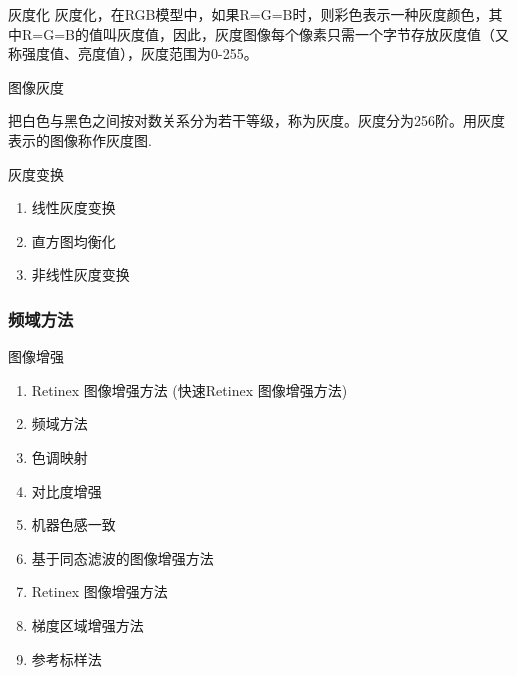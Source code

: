\documentclass{beamer}
\begin{document}
\begin{frame}
  \begin{block}{灰度化}
灰度化，在RGB模型中，如果R=G=B时，则彩色表示一种灰度颜色，其中R=G=B的值叫灰度值，因此，灰度图像每个像素只需一个字节存放灰度值（又称强度值、亮度值），灰度范围为0-255。
\end{block}
\begin{block}{图像灰度}

把白色与黑色之间按对数关系分为若干等级，称为灰度。灰度分为256阶。用灰度表示的图像称作灰度图.

\end{block}
\end{frame}

\begin{frame}

  \begin{block}{灰度变换}
    \begin{enumerate}
    \item 线性灰度变换
    \item 直方图均衡化
    \item 非线性灰度变换
    \end{enumerate}
  \end{block}
\end{frame}


\begin{frame}
    \frametitle{频域方法}
  \begin{block}{图像增强}
    \begin{enumerate}
    \item Retinex 图像增强方法 (快速Retinex 图像增强方法)
    \item 频域方法
    \item 色调映射
    \item 对比度增强
    \item 机器色感一致
    \item 基于同态滤波的图像增强方法
    \item Retinex 图像增强方法
    \item 梯度区域增强方法
    \item 参考标样法
    \end{enumerate}

  \end{block}
\end{frame}
\end{document}
